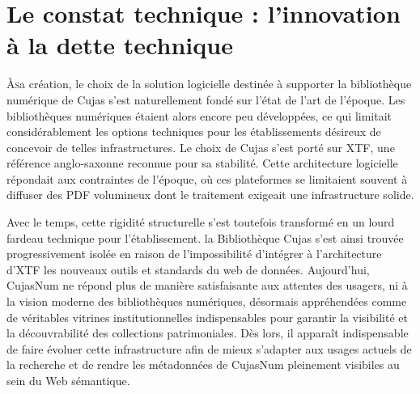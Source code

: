 \chapter[Le constat technique]{Le constat technique : l'innovation à la dette technique}

\lettrine{À} sa création, le choix de la solution logicielle destinée à supporter la bibliothèque numérique de Cujas s'est naturellement fondé sur l'état de l'art de l'époque. Les bibliothèques numériques étaient alors encore peu développées, ce qui limitait considérablement les options techniques pour les établissements désireux de concevoir de telles infrastructures. Le choix de Cujas s'est porté sur \ac{XTF}, une référence anglo-saxonne reconnue pour sa stabilité. Cette architecture logicielle répondait aux contraintes de l'époque, où ces plateformes se limitaient souvent à diffuser des \ac{PDF} volumineux dont le traitement exigeait une infrastructure solide.

Avec le temps, cette rigidité structurelle s'est toutefois transformé en un lourd fardeau technique pour l'établissement. la Bibliothèque Cujas s'est ainsi trouvée progressivement isolée en raison de l'impossibilité d'intégrer à l'architecture d'\ac{XTF} les nouveaux outils et standards du web de données. Aujourd'hui, CujasNum ne répond plus de manière satisfaisante aux attentes des usagers, ni à la vision moderne des bibliothèques numériques, désormais appréhendées comme de véritables vitrines institutionnelles indispensables pour garantir la visibilité et la découvrabilité des collections patrimoniales. Dès lors, il apparaît indispensable de faire évoluer cette infrastructure afin de mieux s'adapter aux usages actuels de la recherche et de rendre les métadonnées de CujasNum pleinement visibiles au sein du Web sémantique.



